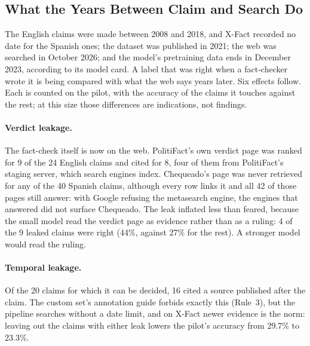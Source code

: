 
\subsection{What the Years Between Claim and Search Do}
\label{subsec:pilot-time}

The English claims were made between 2008 and 2018, and X-Fact recorded
no date for the Spanish ones; the dataset was published in 2021; the web
was searched in October 2026; and the model's pretraining data ends in
December 2023, according to its model card. A label that was right
when a fact-checker wrote it is being compared with what the web says
years later. Six effects follow. Each is counted on the pilot, with the
accuracy of the claims it touches against the rest; at this size those
differences are indications, not findings.

\paragraph{Verdict leakage.} The fact-check itself is now on the web.
PolitiFact's own verdict page was ranked for 9 of the 24 English claims
and cited for 8, four of them from PolitiFact's staging server, which
search engines index. Chequeado's page was never retrieved for any of
the 40 Spanish claims, although every row links it and all 42 of those
pages still answer: with Google refusing the metasearch engine, the
engines that answered did not surface Chequeado. The leak inflated less
than feared, because the small model read the verdict page as evidence
rather than as a ruling: 4 of the 9 leaked claims were right (44\%,
against 27\% for the rest). A stronger model would read the ruling.

\paragraph{Temporal leakage.} Of the 20 claims for which it can be
decided, 16 cited a source published after the claim. The custom set's
annotation guide forbids exactly this (Rule~3), but the pipeline
searches without a date limit, and on X-Fact newer evidence is the norm:
leaving out the claims with either leak lowers the pilot's accuracy
from 29.7\% to 23.3\%.

